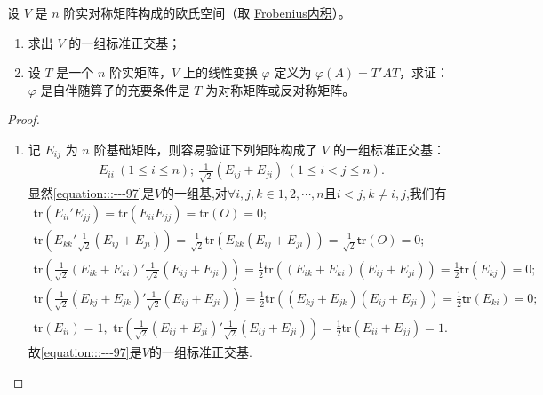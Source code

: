 \documentclass[../../main.tex]{subfiles}
\begin{document}
\begin{proposition}\label{proposition:例9.30}
设 \(V\) 是 \(n\) 阶实对称矩阵构成的欧氏空间（取 \hyperlink{Frobenius 内积}{Frobenius内积}）。
\begin{enumerate}[(1)]
\item 求出 \(V\) 的一组标准正交基；
\item 设 \(T\) 是一个 \(n\) 阶实矩阵，\(V\) 上的线性变换 \(\varphi\) 定义为 \(\varphi(A)=T'AT\)，求证：\(\varphi\) 是自伴随算子的充要条件是 \(T\) 为对称矩阵或反对称矩阵。
\end{enumerate}
\end{proposition}
\begin{proof}
\begin{enumerate}[(1)]
\item 记 \(E_{ij}\) 为 \(n\) 阶基础矩阵，则容易验证下列矩阵构成了 \(V\) 的一组标准正交基：
\begin{align}\label{equation:::---97}
E_{ii}\ (1\leq i\leq n);\ \frac{1}{\sqrt{2}}(E_{ij}+E_{ji})\ (1\leq i < j\leq n).
\end{align}
显然\eqref{equation:::---97}是$V$的一组基,对$\forall i,j,k\in {1,2,\cdots,n}$且$i<j,k\ne i,j$,我们有
\begin{gather*}
\mathrm{tr}\left( E_{ii}'E_{jj} \right) =\mathrm{tr}\left( E_{ii}E_{jj} \right) =\mathrm{tr}\left( O \right) =0;
\\
\mathrm{tr}\left( E_{kk}'\frac{1}{\sqrt{2}}\left( E_{ij}+E_{ji} \right) \right) =\frac{1}{\sqrt{2}}\mathrm{tr}\left( E_{kk}\left( E_{ij}+E_{ji} \right) \right) =\frac{1}{\sqrt{2}}\mathsf{t}\mathrm{r}\left( O \right) =0;
\\
\mathrm{tr}\left( \frac{1}{\sqrt{2}}\left( E_{ik}+E_{ki} \right) ' \frac{1}{\sqrt{2}}\left( E_{ij}+E_{ji} \right) \right) =\frac{1}{2}\mathrm{tr}\left( \left( E_{ik}+E_{ki} \right) \left( E_{ij}+E_{ji} \right) \right) =\frac{1}{2}\mathsf{t}\mathrm{r}\left( E_{kj} \right) =0;
\\
\mathrm{tr}\left( \frac{1}{\sqrt{2}}\left( E_{kj}+E_{jk} \right) ' \frac{1}{\sqrt{2}}\left( E_{ij}+E_{ji} \right) \right) =\frac{1}{2}\mathrm{tr}\left( \left( E_{kj}+E_{jk} \right) \left( E_{ij}+E_{ji} \right) \right) =\frac{1}{2}\mathsf{t}\mathrm{r}\left( E_{ki} \right) =0;
\\
\mathrm{tr}\left( E_{ii} \right) =1,\,\,\mathrm{tr}\left( \frac{1}{\sqrt{2}}\left( E_{ij}+E_{ji} \right) ' \frac{1}{\sqrt{2}}\left( E_{ij}+E_{ji} \right) \right) =\frac{1}{2}\mathrm{tr}\left( E_{ii}+E_{jj} \right) =1.
\end{gather*}
故\eqref{equation:::---97}是$V$的一组标准正交基.


\end{enumerate}
\end{proof}
\end{document}
